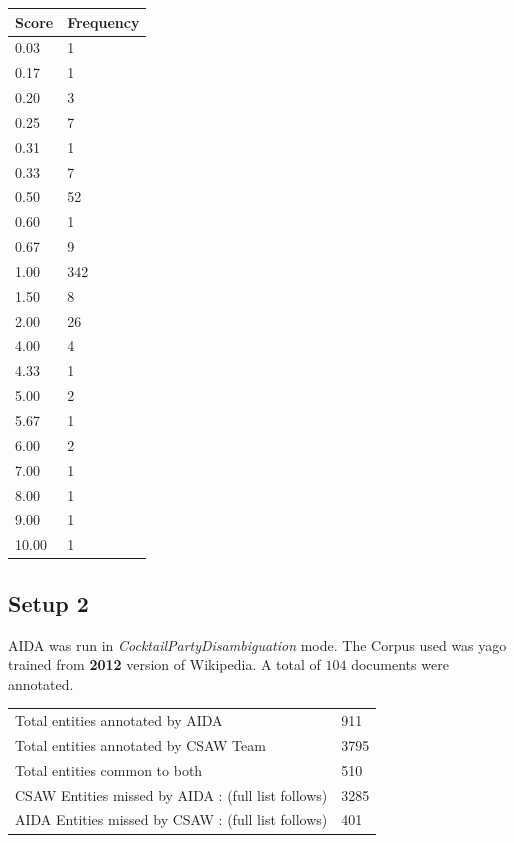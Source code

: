\documentclass[a4paper,10pt]{article}
\begin{document}
\begin{center}
\begin{tabular}{|l|l|}
 \hline
Score & Frequency\\
\hline
0.03 & 1 \\ 
0.17 & 1 \\ 
0.20 & 3 \\ 
0.25 & 7 \\ 
0.31 & 1 \\ 
0.33 & 7 \\ 
0.50 & 52 \\ 
0.60 & 1 \\ 
0.67 & 9 \\ 
1.00 & 342 \\ 
1.50 & 8 \\ 
2.00 & 26 \\ 
4.00 & 4 \\ 
4.33 & 1 \\ 
5.00 & 2 \\ 
5.67 & 1 \\ 
6.00 & 2 \\ 
7.00 & 1 \\ 
8.00 & 1 \\ 
9.00 & 1 \\ 
10.00 & 1 \\ \hline
\end{tabular}
\end{center}
\onecolumn
\bigskip 
\newpage
\newpage

\subsection{Setup 2}
AIDA was run in \emph{CocktailPartyDisambiguation} mode. 
The Corpus used was yago trained from \textbf{2012} version of Wikipedia.
A total of $104$ documents were annotated.

\begin{center}
\bigskip \bigskip \bigskip \bigskip

\begin{tabular}{|l|l|}
 \hline
Total entities annotated by AIDA & 911\\ 
Total entities annotated by CSAW Team & 3795\\ 
Total entities common to both & 510\\ 
CSAW Entities missed by AIDA : (full list follows)  & 3285\\ 
AIDA Entities missed by CSAW : (full list follows)  & 401\\ 
\hline
\end{tabular}
\end{center}
\end{document}
